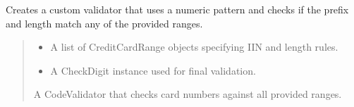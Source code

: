 \documentclass[letterpaper,10pt,english]{sphinxmanual}
\begin{document}
\begin{fulllineitems}
\begin{fulllineitems}
\label{\detokenize{apache_commons_validator_python.routines:apache_commons_validator_python.routines.credit_card_validator.CreditCardValidator.create_range_validator}}
\pysigstartsignatures
{}
\pysigstopsignatures
\sphinxAtStartPar
Creates a custom validator that uses a numeric pattern and checks if the
prefix and length match any of the provided ranges.
\begin{quote}\begin{description}
\begin{itemize}
\item {} 
\sphinxAtStartPar
{} \textendash{} A list of CreditCardRange objects specifying IIN and length rules.

\item {} 
\sphinxAtStartPar
{} \textendash{} A CheckDigit instance used for final validation.

\end{itemize}

\sphinxAtStartPar
A CodeValidator that checks card numbers against all provided ranges.

\end{description}\end{quote}

\end{fulllineitems}



\end{fulllineitems}
\end{document}
